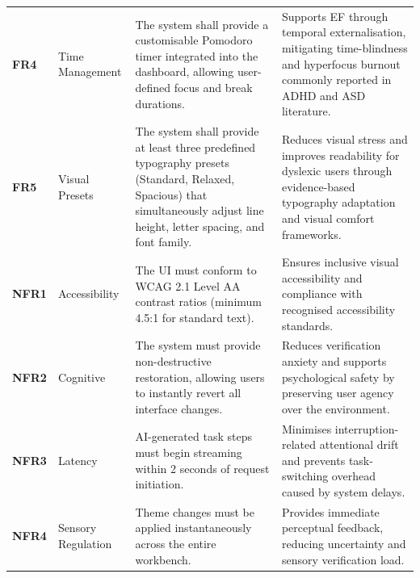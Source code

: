 \begin{table}[H]
\begin{tabularx}{\textwidth}{@{} l l X X @{}}
        \textbf{FR4} & Time Management &
        The system shall provide a customisable Pomodoro timer integrated into the dashboard, allowing user-defined focus and break durations. &
        Supports \gls{EF} through temporal externalisation, mitigating \gls{time-blindness} and \gls{hyperfocus} burnout commonly reported in \gls{ADHD} and \gls{ASD} literature. \\ 
        \addlinespace
        
        \textbf{FR5} & Visual Presets &
        The system shall provide at least three predefined typography presets (Standard, Relaxed, Spacious) that simultaneously adjust line height, letter spacing, and font family. &
        Reduces visual stress and improves readability for dyslexic users through evidence-based typography adaptation and visual comfort frameworks. \\ 
        
        \midrule
        
        \textbf{NFR1} & Accessibility &
        The UI must conform to \gls{WCAG} 2.1 Level AA contrast ratios (minimum 4.5:1 for standard text). &
        Ensures inclusive visual accessibility and compliance with recognised accessibility standards. \\ 
        \addlinespace
        
        \textbf{NFR2} & Cognitive &
        The system must provide non-destructive restoration, allowing users to instantly revert all interface changes. &
        Reduces verification anxiety and supports psychological safety by preserving user agency over the environment. \\ 
        \addlinespace
        
        \textbf{NFR3} & Latency &
        \gls{AI}-generated task steps must begin streaming within 2 seconds of request initiation. &
        Minimises interruption-related attentional drift and prevents task-switching overhead caused by system delays. \\ 
        \addlinespace
        
        \textbf{NFR4} & Sensory Regulation &
        Theme changes must be applied instantaneously across the entire workbench. &
        Provides immediate perceptual feedback, reducing uncertainty and sensory verification load. \\ 
        
        \bottomrule
    \end{tabularx}
\end{table}

